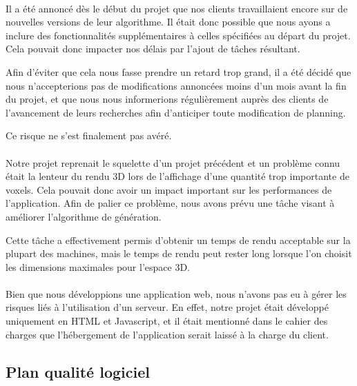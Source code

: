 \documentclass{scrartcl}
\begin{document}
\paragraph{}
Il a été annoncé dès le début du projet que nos clients travaillaient encore sur de nouvelles versions de leur algorithme. Il était donc possible que nous ayons a inclure des fonctionnalités supplémentaires à celles spécifiées au départ du projet. Cela pouvait donc impacter nos délais par l'ajout de tâches résultant. 

Afin d'éviter que cela nous fasse prendre un retard trop grand, il a été décidé que nous n'accepterions pas de modifications annoncées moins d'un mois avant la fin du projet, et que nous nous informerions régulièrement auprès des clients de l'avancement de leurs recherches afin d'anticiper toute modification de planning.

Ce risque ne s'est finalement pas avéré.

\paragraph{}
Notre projet reprenait le squelette d'un projet précédent et un problème connu était la lenteur du rendu 3D lors de l'affichage d'une quantité trop importante de voxels. Cela pouvait donc avoir un impact important sur les performances de l'application. Afin de palier ce problème, nous avons prévu une tâche visant à améliorer l'algorithme de génération.

Cette tâche a effectivement permis d'obtenir un temps de rendu acceptable sur la plupart des machines, mais le temps de rendu peut rester long lorsque l'on choisit les dimensions maximales pour l'espace 3D.

\paragraph{}
Bien que nous développions une application web, nous n'avons pas eu à gérer les risques liés à l'utilisation d'un serveur. En effet, notre projet était développé uniquement en HTML et Javascript, et il était mentionné dans le cahier des charges que l'hébergement de l'application serait laissé à la charge du client.

\subsection{Plan qualité logiciel}
\paragraph{}
\end{document}
